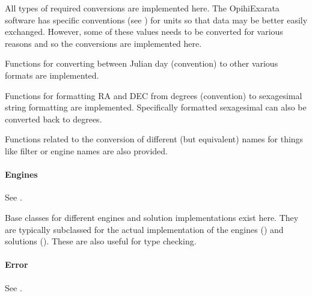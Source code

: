 \documentclass[letterpaper,11pt,english]{sphinxmanual}
\begin{document}
\sphinxAtStartPar
All types of required conversions are implemented here. The OpihiExarata
software has specific conventions (see {\hyperref[\detokenize{technical/conventions:technical-conventions}]{}}) for units
so that data may be better easily exchanged. However, some of these values
needs to be converted for various reasons and so the conversions are
implemented here.

\sphinxAtStartPar
Functions for converting between Julian day (convention) to other various
formats are implemented.

\sphinxAtStartPar
Functions for formatting RA and DEC from degrees (convention) to sexagesimal
string formatting are implemented. Specifically formatted sexagesimal can also
be converted back to degrees.

\sphinxAtStartPar
Functions related to the conversion of different (but equivalent) names for
things like filter or engine names are also provided.


\paragraph{Engines}
\label{\detokenize{technical/architecture/library:engines}}
\sphinxAtStartPar
See {\hyperref[\detokenize{code/opihiexarata.library.engine:module-opihiexarata.library.engine}]{}}.

\sphinxAtStartPar
Base classes for different engines and solution implementations exist here.
They are typically subclassed for the actual implementation of the engines
({\hyperref[\detokenize{technical/architecture/services_engines:technical-architecture-services-engines}]{}}) and solutions
({\hyperref[\detokenize{technical/architecture/vehicles_solutions:technical-architecture-vehicles-solutions}]{}}). These are also useful for
type checking.


\paragraph{Error}
\label{\detokenize{technical/architecture/library:error}}
\sphinxAtStartPar
See {\hyperref[\detokenize{code/opihiexarata.library.error:module-opihiexarata.library.error}]{}}.
\end{document}
